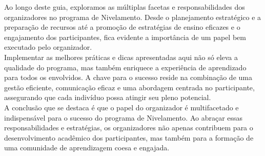 Ao longo deste guia, exploramos as múltiplas facetas e responsabilidades dos organizadores no programa de Nivelamento. Desde o planejamento estratégico e a preparação de recursos até a promoção de estratégias de ensino eficazes e o engajamento dos participantes, fica evidente a importância de um papel bem executado pelo organizador.\\

Implementar as melhores práticas e dicas apresentadas aqui não só eleva a qualidade do programa, mas também enriquece a experiência de aprendizado para todos os envolvidos. A chave para o sucesso reside na combinação de uma gestão eficiente, comunicação eficaz e uma abordagem centrada no participante, assegurando que cada indivíduo possa atingir seu pleno potencial.\\

A conclusão que se destaca é que o papel do organizador é multifacetado e indispensável para o sucesso do programa de Nivelamento. Ao abraçar essas responsabilidades e estratégias, os organizadores não apenas contribuem para o desenvolvimento acadêmico dos participantes, mas também para a formação de uma comunidade de aprendizagem coesa e engajada.

